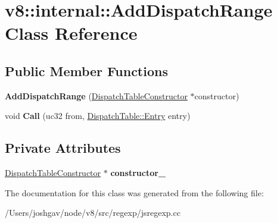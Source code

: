 \hypertarget{classv8_1_1internal_1_1_add_dispatch_range}{}\section{v8\+:\+:internal\+:\+:Add\+Dispatch\+Range Class Reference}
\label{classv8_1_1internal_1_1_add_dispatch_range}
\subsection*{Public Member Functions}
\begin{DoxyCompactItemize}
\item 
{\bfseries Add\+Dispatch\+Range} (\hyperlink{classv8_1_1internal_1_1_dispatch_table_constructor}{Dispatch\+Table\+Constructor} $\ast$constructor)\hypertarget{classv8_1_1internal_1_1_add_dispatch_range_aabb3eb748f5a566349ae5946fef1103b}{}\label{classv8_1_1internal_1_1_add_dispatch_range_aabb3eb748f5a566349ae5946fef1103b}

\item 
void {\bfseries Call} (uc32 from, \hyperlink{classv8_1_1internal_1_1_dispatch_table_1_1_entry}{Dispatch\+Table\+::\+Entry} entry)\hypertarget{classv8_1_1internal_1_1_add_dispatch_range_a17e1406e159be04ef2b1fcc36d94c888}{}\label{classv8_1_1internal_1_1_add_dispatch_range_a17e1406e159be04ef2b1fcc36d94c888}

\end{DoxyCompactItemize}
\subsection*{Private Attributes}
\begin{DoxyCompactItemize}
\item 
\hyperlink{classv8_1_1internal_1_1_dispatch_table_constructor}{Dispatch\+Table\+Constructor} $\ast$ {\bfseries constructor\+\_\+}\hypertarget{classv8_1_1internal_1_1_add_dispatch_range_ad9e4986bc6b16cb976a50cebd857ecc0}{}\label{classv8_1_1internal_1_1_add_dispatch_range_ad9e4986bc6b16cb976a50cebd857ecc0}

\end{DoxyCompactItemize}


The documentation for this class was generated from the following file\+:\begin{DoxyCompactItemize}
\item 
/\+Users/joshgav/node/v8/src/regexp/jsregexp.\+cc\end{DoxyCompactItemize}
